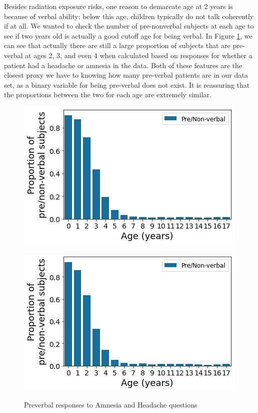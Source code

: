 \documentclass[11pt, letterpaper]{amsart}
\begin{document}
Besides radiation exposure risks, one reason to demarcate age at $2$ years is because of verbal ability: below this age, children typically do not talk coherently if at all. We wanted to check the number of pre-nonverbal subjects at each age to see if two years old is actually a good cutoff age for being verbal. In Figure \ref{fig:preverbal}, we can see that actually there are still a large proportion of subjects that are pre-verbal at ages 2, 3, and even 4 when calculated based on responses for whether a patient had a headache or amnesia in the data. Both of these features are the closest proxy we have to knowing how many pre-verbal patients are in our data set, as a binary variable for being pre-verbal does not exist. It is reassuring that the proportions between the two for each age are extremely similar. 
\begin{figure}
	\begin{minipage}[b]{0.5\linewidth}
		\centering
		\includegraphics[width=\textwidth]{amnesia_preverbal.png}
		\label{fig:amnesia_preverbal}
	\end{minipage}%
	\begin{minipage}[b]{0.5\linewidth}
		\centering
		\includegraphics[width=\textwidth]{headache_preverbal.png}
		\label{fig:headache_preverbal}
	\end{minipage}
	\caption{Preverbal responses to Amnesia and Headache questions}\label{fig:preverbal}
\end{figure}
\end{document}
